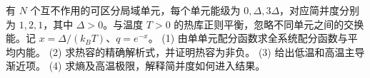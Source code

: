 有 \(N\) 个互不作用的可区分局域单元，每个单元能级为 \(0,\Delta,3\Delta\)，对应简并度分别为 \(1,2,1\)，其中 \(\Delta>0\)。与温度 \(T>0\) 的热库正则平衡，忽略不同单元之间的交换能。记 \(x=\Delta/(k_BT)\)、\(q=e^{-x}\)。
(1) 由单单元配分函数求全系统配分函数与平均内能。
(2) 求热容的精确解析式，并证明热容为非负。
(3) 给出低温和高温主导渐近项。
(4) 求熵及高温极限，解释简并度如何进入结果。
